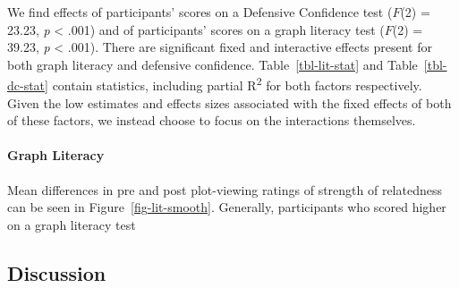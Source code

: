 \documentclass[manuscript,screen,review]{acmart}
\begin{document}
\begin{figure}


\caption{\label{fig-dc-smooth}}

\end{figure}%

We find effects of participants' scores on a Defensive Confidence test
(\(F\)(2) = 23.23, \emph{p} \textless{} .001) and of participants'
scores on a graph literacy test \citep{garcia_2016} (\(F\)(2) = 39.23,
\emph{p} \textless{} .001). There are significant fixed and interactive
effects present for both graph literacy and defensive confidence.
Table~\ref{tbl-lit-stat} and Table~\ref{tbl-dc-stat} contain statistics,
including partial R\textsuperscript{2} for both factors respectively.
Given the low estimates and effects sizes associated with the fixed
effects of both of these factors, we instead choose to focus on the
interactions themselves.

\paragraph{Graph Literacy}\label{graph-literacy}

Mean differences in pre and post plot-viewing ratings of strength of
relatedness can be seen in Figure~\ref{fig-lit-smooth}. Generally,
participants who scored higher on a graph literacy test

\subsection{Discussion}\label{discussion}
\end{document}
